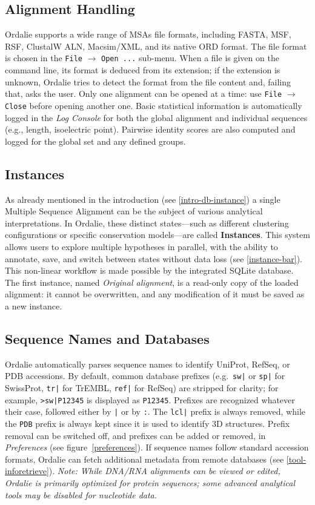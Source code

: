 \documentclass[a4paper]{article}
\begin{document}
\subsection{Alignment Handling}
Ordalie supports a wide range of MSAs file formats, including FASTA, MSF, RSF, ClustalW ALN, Macsim/XML, and its native ORD format. The file format is chosen in the \texttt{File} $\rightarrow$ \texttt{Open ...} sub-menu. When a file is given on the command line, its format is deduced from its extension; if the extension is unknown, Ordalie tries to detect the format from the file content and, failing that, asks the user. Only one alignment can be opened at a time: use \texttt{File} $\rightarrow$ \texttt{Close} before opening another one.
\smallskip
Basic statistical information is automatically logged in the \textit{Log Console} for both the global alignment and individual sequences (e.g., length, isoelectric point). Pairwise identity scores are also computed and logged for the global set and any defined groups.

\subsection{Instances}
As already mentioned in the introduction (see \ref{intro-db-instance}) a single Multiple Sequence Alignment can be the subject of various analytical interpretations. In Ordalie, these distinct states—such as different clustering configurations or specific conservation models—are called \textbf{Instances}. This system allows users to explore multiple hypotheses in parallel, with the ability to annotate, save, and switch between states without data loss (see \ref{instance-bar}). This non-linear workflow is made possible by the integrated SQLite database.
\smallskip
The first instance, named \textit{Original alignment}, is a read-only copy of the loaded alignment: it cannot be overwritten, and any modification of it must be saved as a new instance.

\subsection{Sequence Names and Databases}
Ordalie automatically parses sequence names to identify UniProt, RefSeq, or PDB accessions. By default, common database prefixes (e.g.\ \texttt{sw|} or \texttt{sp|} for SwissProt, \texttt{tr|} for TrEMBL, \texttt{ref|} for RefSeq) are stripped for clarity; for example, \texttt{>sw|P12345} is displayed as \texttt{P12345}. Prefixes are recognized whatever their case, followed either by \texttt{|} or by \texttt{:}. The \texttt{lcl|} prefix is always removed, while the \texttt{PDB} prefix is always kept since it is used to identify 3D structures. Prefix removal can be switched off, and prefixes can be added or removed, in \textit{Preferences} (see figure~\ref{preferences}).
\smallskip
If sequence names follow standard accession formats, Ordalie can fetch additional metadata from remote databases (see \ref{tool-inforetrieve}).
\smallskip
\textit{Note: While DNA/RNA alignments can be viewed or edited, Ordalie is primarily optimized for protein sequences; some advanced analytical tools may be disabled for nucleotide data.}
\end{document}
